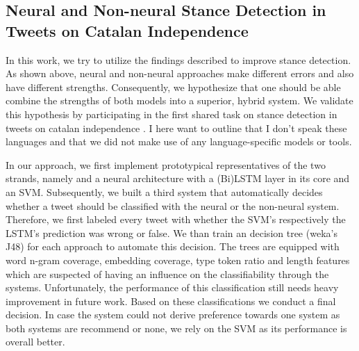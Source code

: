 \documentclass[11pt]{article}
\begin{document}
\subsection{Neural and Non-neural Stance Detection in Tweets on Catalan Independence \cite{wojatzki2017ibereval}}

In this work, we try to utilize the findings described to improve stance detection.
As shown above, neural and non-neural approaches make different errors and also have different strengths.
Consequently, we hypothesize that one should be able combine the strengths of both models into a superior, hybrid system.
We validate this hypothesis by participating in the first shared task on stance detection in tweets on catalan independence \cite{iberEval2017}.
I here want to outline that I don't speak these languages and that we did not make use of any language-specific models or tools.

In our approach, we first implement prototypical representatives of the two strands, namely and a neural architecture with a (Bi)LSTM layer in its core and an SVM.
Subsequently, we built a third system that automatically decides whether a tweet should be classified with the neural or the non-neural system. 
Therefore, we first labeled every tweet with whether the SVM's respectively the LSTM's prediction was wrong or false. 
We than train an decision tree (weka's J48) for each approach to automate this decision. 
The trees are equipped with word n-gram coverage, embedding coverage, type token ratio and length features which are suspected of having an influence on the classifiability through the systems. 
Unfortunately, the performance of this classification still needs heavy improvement in future work. 
Based on these classifications we conduct a final decision. 
In case the system could not derive preference towards one system as both systems are recommend or none, we rely on the SVM as its performance is overall better.
\end{document}
